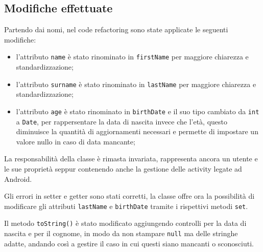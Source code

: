     \subsection{Modifiche effettuate}
    Partendo dai nomi, nel code refactoring sono state applicate le seguenti modifiche:
    \begin{itemize}
        \item l'attributo \texttt{name} è stato rinominato in \texttt{firstName} per maggiore chiarezza e standardizzazione;
        \item l'attributo \texttt{surname} è stato rinominato in \texttt{lastName} per maggiore chiarezza e standardizzazione;
        \item l'attributo \texttt{age} è stato rinominato in \texttt{birthDate} e il suo tipo cambiato da \texttt{int} a \texttt{Date}, per rappersentare la data di nascita invece che l'età,
        questo diminuisce la quantità di aggiornamenti necessari e permette di impostare un valore nullo in caso di data mancante;         
    \end{itemize}

    La responsabilità della classe è rimasta invariata, rappresenta ancora un utente e le sue proprietà seppur contenendo anche la gestione delle activity legate ad Android.

    Gli errori in setter e getter sono stati corretti, la classe offre ora la possibilità di modificare gli attributi \texttt{lastName} e \texttt{birthDate} tramite i rispettivi metodi \texttt{set}.

    Il metodo \texttt{toString()} è stato modificato aggiungendo controlli per la data di nascita e per il cognome, in modo da non stampare \texttt{null} ma delle stringhe adatte, 
    andando così a gestire il caso in cui questi siano mancanti o sconosciuti.
       
